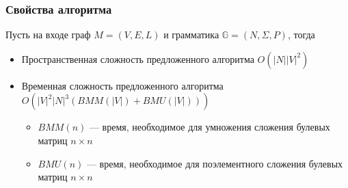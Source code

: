 \documentclass[xcolor=table]{beamer}
\begin{document}
\begin{frame}
  \transwipe[direction=90]
  \frametitle{Свойства алгоритма}

Пусть на входе граф $M=(V,E,L)$ и грамматика $\mathbb{G} = (N, \Sigma, P)$, тогда
\begin{itemize} 
\item Пространственная сложность предложенного алгоритма $O(|N||V|^2)$
\item Временная сложность предложенного алгоритма $O(|V|^2 |N|^3(BMM(|V|) + BMU (|V|)))$
\begin{itemize} 
\item $BMM(n)$ --- время, необходимое для умножения сложения булевых матриц $n\times n$
\item $BMU(n)$ --- время, необходимое для поэлементного сложения булевых матриц $n\times n$
\end{itemize}

\end{itemize}

\end{frame}
\end{document}
